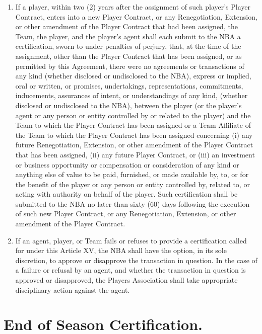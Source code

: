 \documentclass[
]{book}
\begin{document}
\begin{enumerate}
\item
  If a player, within two (2) years after the assignment of such player's Player Contract, enters into a new Player Contract, or any Renegotiation, Extension, or other amendment of the Player Contract that had been assigned, the Team, the player, and the player's agent shall each submit to the NBA a certification, sworn to under penalties of perjury, that, at the time of the assignment, other than the Player Contract that has been assigned, or as permitted by this Agreement, there were no agreements or transactions of any kind (whether disclosed or undisclosed to the NBA), express or implied, oral or written, or promises, undertakings, representations, commitments, inducements, assurances of intent, or understandings of any kind, (whether disclosed or undisclosed to the NBA), between the player (or the player's agent or any person or entity controlled by or related to the player) and the Team to which the Player Contract has been assigned or a Team Affiliate of the Team to which the Player Contract has been assigned concerning (i) any future Renegotiation, Extension, or other amendment of the Player Contract that has been assigned, (ii) any future Player Contract, or (iii) an investment or business opportunity or compensation or consideration of any kind or anything else of value to be paid, furnished, or made available by, to, or for the benefit of the player or any person or entity controlled by, related to, or acting with authority on behalf of the player. Such certification shall be submitted to the NBA no later than sixty (60) days following the execution of such new Player Contract, or any Renegotiation, Extension, or other amendment of the Player Contract.
\item
  If an agent, player, or Team fails or refuses to provide a certification called for under this Article XV, the NBA shall have the option, in its sole discretion, to approve or disapprove the transaction in question. In the case of a failure or refusal by an agent, and whether the transaction in question is approved or disapproved, the Players Association shall take appropriate disciplinary action against the agent.
\end{enumerate}

\hypertarget{end-of-season-certification.}{%
\section{End of Season Certification.}\label{end-of-season-certification.}}
\end{document}
